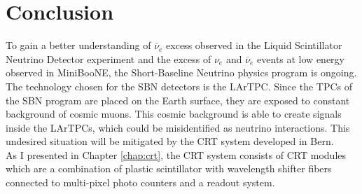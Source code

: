 \documentclass[a4paper]{article}\linespread{1.4}
\begin{document}
\clearpage
\section{Conclusion}
\label{chap:concl}
To gain a better understanding of $\bar{\nu}_{e}$ excess observed in the Liquid Scintillator Neutrino Detector experiment and the excess of $\nu_{e}$ and $\bar{\nu}_{e}$ events at low energy observed in MiniBooNE, the Short-Baseline Neutrino physics program is ongoing. 
The technology chosen for the SBN detectors is the LArTPC.
Since the TPCs of the SBN program are placed on the Earth surface, they are exposed to constant background of cosmic muons. This cosmic background is able to create signals inside the LArTPCs, which could be misidentified as neutrino interactions. This undesired situation will be mitigated by the CRT system developed in Bern.
\\As I presented in Chapter \ref{chap:crt}, the CRT system consists of CRT modules which are a combination of plastic scintillator with wavelength shifter fibers connected to multi-pixel photo counters and a readout system.
\end{document}
